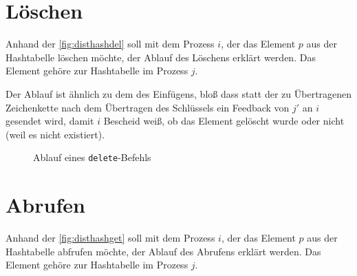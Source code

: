 \documentclass{scrreprt}
\begin{document}
\section{Löschen}
Anhand der \autoref{fig:disthashdel} soll mit dem Prozess $i$, der das Element $p$ aus der Hashtabelle löschen möchte, der Ablauf des Löschens erklärt werden. Das Element gehöre zur Hashtabelle im Prozess $j$.

Der Ablauf ist ähnlich zu dem des Einfügens, bloß dass statt der zu Übertragenen Zeichenkette nach dem Übertragen des Schlüssels ein Feedback von $j'$ an $i$ gesendet wird, damit $i$ Bescheid weiß, ob das Element gelöscht wurde oder nicht (weil es nicht existiert).

\begin{figure}[!ht]
\centering
{}
\caption{Ablauf eines \lstinline`delete`-Befehls}
\label{fig:disthashdel}
\end{figure}

\section{Abrufen}
Anhand der \autoref{fig:disthashget} soll mit dem Prozess $i$, der das Element $p$ aus der Hashtabelle abfrufen möchte, der Ablauf des Abrufens erklärt werden. Das Element gehöre zur Hashtabelle im Prozess $j$.
\end{document}
